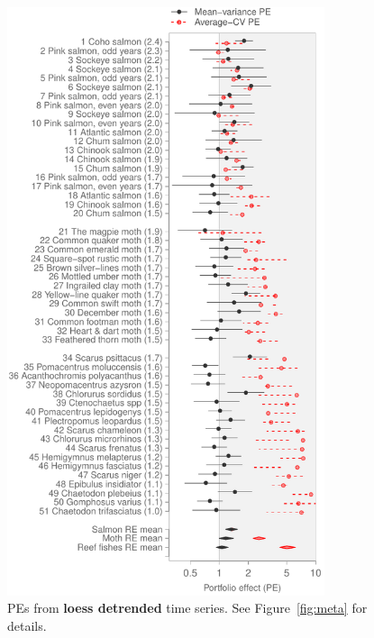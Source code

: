 \begin{figure}[htbp]
  \centering
  \includegraphics[height=6.8in]{prophets/PE_comparison_z_meta_loess_detrend_taxa_20121214.pdf}
  \caption[PEs from loess detrended time series]{PEs from \textbf{loess detrended} time series. See
    Figure~\ref{fig:meta} for details.
}
\label{fig:meta-detrend-loess}
\end{figure}
\clearpage


